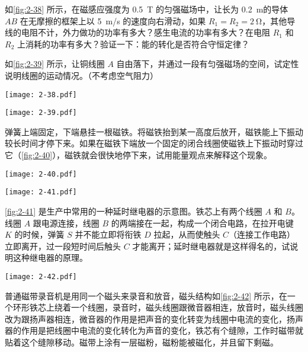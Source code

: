 \begin{Exercise}
\begin{question}
\begin{tasks}
  \end{tasks}
  \item 如\cref{fig:2-38} 所示，在磁感应强度为 \qty{0.5}{T} 的匀强磁场中，让长为 \qty{0.2}{m}的导体 $AB$ 在无摩擦的框架上以 \qty{5}{m/s} 的速度向右滑动，如果 $R_1=R_2=\qty{2}{\ohm}$，其他导线的电阻不计，外力做功的功率有多大？感生电流的功率有多大？在电阻 $R_1$ 和 $R_2$ 上消耗的功率有多大？验证一下：能的转化是否符合守恒定律？
  \item 如\cref{fig:2-39} 所示，让铜线圈 $A$ 自由落下，并通过一段有匀强磁场的空间，试定性说明线圈的运动情况。（不考虑空气阻力）
  \begin{figurehere}
    \begin{minipage}[b]{0.48\linewidth}\centering
      \texttt{[image: 2-38.pdf]}
      \caption{}\label{fig:2-38}
    \end{minipage}
    \begin{minipage}[b]{0.48\linewidth}\centering
      \texttt{[image: 2-39.pdf]}
      \caption{}\label{fig:2-39}
    \end{minipage}
  \end{figurehere}
  \item 弹簧上端固定，下端悬挂一根磁铁。将磁铁抬到某一高度后放开，磁铁能上下振动较长时间才停下来。如果在磁铁下端放一个固定的闭合线圈使磁铁上下振动时穿过它（\cref{fig:2-40}），磁铁就会很快地停下来，试用能量观点来解释这个现象。
  \begin{figurehere}
    \begin{minipage}[b]{0.48\linewidth}\centering
      \texttt{[image: 2-40.pdf]}
      \caption{}\label{fig:2-40}
    \end{minipage}
    \begin{minipage}[b]{0.48\linewidth}\centering
      \texttt{[image: 2-41.pdf]}
      \caption{}\label{fig:2-41}
    \end{minipage}
  \end{figurehere}
  \item \cref{fig:2-41} 是生产中常用的一种延时继电器的示意图。铁芯上有两个线圈 $A$ 和 $B$。线圈 $A$ 跟电源连接，线圈 $B$ 的两端接在一起，构成一个闭合电路，在拉开电键 $K$ 的时候，弹簧 $S$ 并不能立即将衔铁 $D$ 拉起，从而使触头 $C$（连接工作电路）立即离开，过一段短时间后触头 $C$ 才能离开；延时继电器就是这样得名的，试说明这种继电器的原理。
  \begin{figurehere}
    \begin{minipage}{\linewidth}\centering
      \texttt{[image: 2-42.pdf]}
      \caption{}\label{fig:2-42}
    \end{minipage}
  \end{figurehere}
  \item 普通磁带录音机是用同一个磁头来录音和放音，磁头结构如\cref{fig:2-42} 所示，在一个环形铁芯上绕着一个线圈，录音时，磁头线圈跟微音器相连，放音时，磁头线圈改为跟扬声器相连，微音器的作用是把声音的变化转变为线圈中电流的变化，扬声器的作用是把线圈中电流的变化转化为声音的变化，铁芯有个缝隙，工作时磁带就贴着这个缝隙移动。磁带上涂有一层磁粉，磁粉能被磁化，并且留下剩磁。


\end{question}
\end{Exercise}
